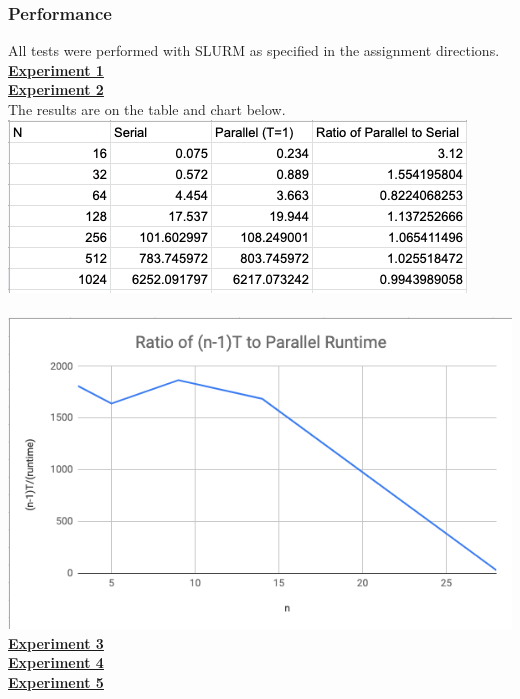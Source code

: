 \documentclass{article}
\begin{document}
\begin{adjustwidth}{-2cm}{-2cm}
\subsubsection{Performance}
All tests were performed with SLURM as specified in the assignment directions.\\
\textbf{\underline{Experiment 1}}\\
\textbf{\underline{Experiment 2}}\\
The results are on the table and chart below.\\
\includegraphics[width=\linewidth]{e2dat.png}\\
\null\\
\includegraphics[width=\linewidth]{e2.png}\\
\textbf{\underline{Experiment 3}}\\
\textbf{\underline{Experiment 4}}\\
\textbf{\underline{Experiment 5}}

\end{adjustwidth}
\end{document}
